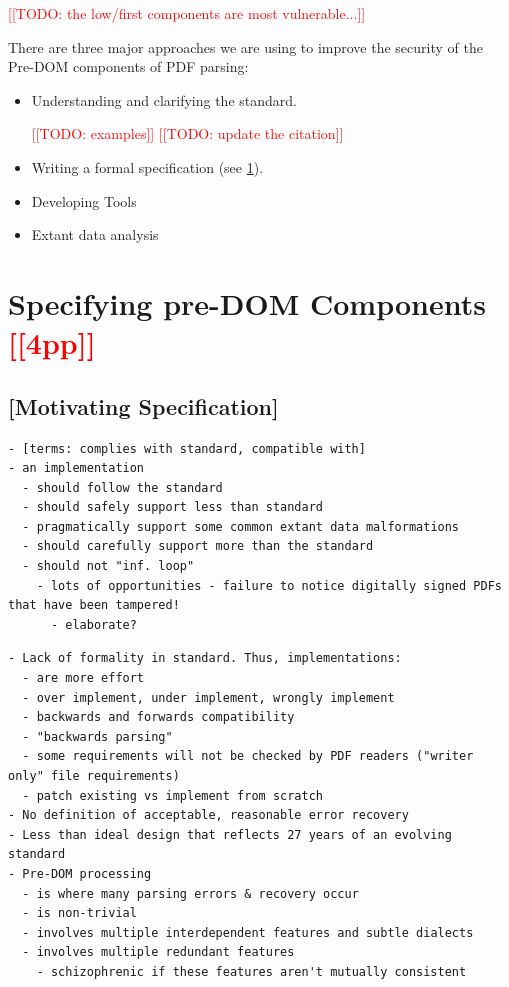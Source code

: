 \documentclass[conference,12pt]{IEEEtran}
\newcommand{\note}[1]{\noteYes{#1}}
\newcommand{\noteYes}[1]{\textcolor{red}{[[#1]]}}
\newcommand{\todo}[1]{\note{TODO: #1}}
\begin{document}
\todo{the low/first components are most vulnerable...}
     
There are three major approaches we are using to improve the security of the
Pre-DOM components of PDF parsing:
\begin{itemize}
 \item Understanding and clarifying the standard.
  
   \todo{examples}
   \cite{pdfspec} \todo{update the citation}    
 \item Writing a formal specification (see \cref{sec:specifying}).

 \item Developing Tools
 
 \item Extant data analysis
\end{itemize}

\section{Specifying pre-DOM Components \note{4pp}}
\label{sec:specifying}

\subsection{[Motivating Specification]}
\begin{lstlisting}[style=meta]
- [terms: complies with standard, compatible with]
- an implementation
  - should follow the standard
  - should safely support less than standard
  - pragmatically support some common extant data malformations
  - should carefully support more than the standard
  - should not "inf. loop"
    - lots of opportunities - failure to notice digitally signed PDFs that have been tampered! 
      - elaborate?
\end{lstlisting}


\begin{lstlisting}[style=meta]
- Lack of formality in standard. Thus, implementations:
  - are more effort
  - over implement, under implement, wrongly implement
  - backwards and forwards compatibility
  - "backwards parsing"
  - some requirements will not be checked by PDF readers ("writer only" file requirements) 
  - patch existing vs implement from scratch
- No definition of acceptable, reasonable error recovery
- Less than ideal design that reflects 27 years of an evolving standard
- Pre-DOM processing
  - is where many parsing errors & recovery occur
  - is non-trivial
  - involves multiple interdependent features and subtle dialects
  - involves multiple redundant features
    - schizophrenic if these features aren't mutually consistent
\end{lstlisting}
\end{document}
